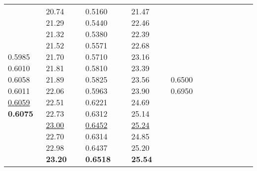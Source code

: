 \documentclass[runningheads]{llncs}
\begin{document}
\begin{table}[!ht]
\begin{tabular}{|p{7em}|p{2.5em}|p{2.5em}|p{3em}|p{2.5em}|p{3em}|p{2.5em}|p{3em}|p{2.5em}|p{3em}|p{2.5em}|p{3em}|}
0.5985 \newline{}0.6010 \newline{}0.6058 \newline{}0.6011 \newline{}\underline{0.6059} \newline{}\bfseries{0.6075} & 20.74 \newline{}21.29 \newline{}21.32 \newline{}21.52 \newline{}21.70 \newline{}21.81 \newline{}21.89 \newline{}22.06 \newline{}22.51 \newline{}22.73 \newline{}\underline{23.00} \newline{}22.70 \newline{}22.98 \newline{}\bfseries{23.20} & 0.5160 \newline{}0.5440 \newline{}0.5380 \newline{}0.5571 \newline{}0.5710 \newline{}0.5810 \newline{}0.5825 \newline{}0.5963 \newline{}0.6221 \newline{}0.6312 \newline{}\underline{0.6452} \newline{}0.6314 \newline{}0.6437 \newline{}\bfseries{0.6518} & 21.47 \newline{}22.46 \newline{}22.39 \newline{}22.68 \newline{}23.16 \newline{}23.39 \newline{}23.56 \newline{}23.90 \newline{}24.69 \newline{}25.14 \newline{}\underline{25.24} \newline{}24.85 \newline{}25.20 \newline{}\bfseries{25.54} & 0.6500\newline{} 0.6950\newline{} 
\end{tabular}
\end{table}
\end{document}
